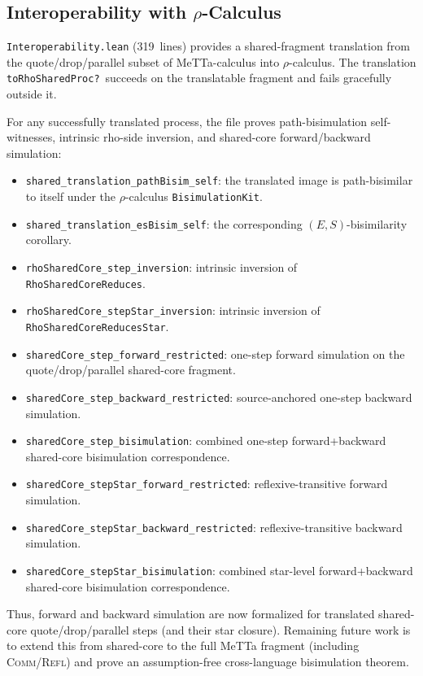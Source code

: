 \documentclass[11pt]{article}
\theoremstyle{definition}
\theoremstyle{remark}
\begin{document}
\subsection{Interoperability with \texorpdfstring{$\rho$}{rho}-Calculus}

\texttt{Interoperability.lean} (319~lines) provides a shared-fragment
translation from the quote/drop/parallel subset of MeTTa-calculus into
$\rho$-calculus.  The translation \texttt{toRhoSharedProc?}~succeeds on
the translatable fragment and fails gracefully outside it.

For any successfully translated process, the file proves path-bisimulation
self-witnesses, intrinsic rho-side inversion, and shared-core
forward/backward simulation:

\begin{itemize}
\item \texttt{shared\_translation\_pathBisim\_self}: the translated image
  is path-bisimilar to itself under the $\rho$-calculus
  \texttt{BisimulationKit}.
\item \texttt{shared\_translation\_esBisim\_self}: the corresponding
  $(E,S)$-bisimilarity corollary.
\item \texttt{rhoSharedCore\_step\_inversion}: intrinsic inversion of
  \texttt{RhoSharedCoreReduces}.
\item \texttt{rhoSharedCore\_stepStar\_inversion}: intrinsic inversion of
  \texttt{RhoSharedCoreReducesStar}.
\item \texttt{sharedCore\_step\_forward\_restricted}: one-step forward
  simulation on the quote/drop/parallel shared-core fragment.
\item \texttt{sharedCore\_step\_backward\_restricted}: source-anchored
  one-step backward simulation.
\item \texttt{sharedCore\_step\_bisimulation}: combined one-step
  forward+backward shared-core bisimulation correspondence.
\item \texttt{sharedCore\_stepStar\_forward\_restricted}: reflexive-transitive
  forward simulation.
\item \texttt{sharedCore\_stepStar\_backward\_restricted}: reflexive-transitive
  backward simulation.
\item \texttt{sharedCore\_stepStar\_bisimulation}: combined star-level
  forward+backward shared-core bisimulation correspondence.
\end{itemize}

\noindent
Thus, forward and backward simulation are now formalized for translated
shared-core quote/drop/parallel steps (and their star closure).  Remaining
future work is to extend this from shared-core to the full MeTTa fragment
(including \textsc{Comm}/\textsc{Refl}) and prove an assumption-free
cross-language bisimulation theorem.
\end{document}
